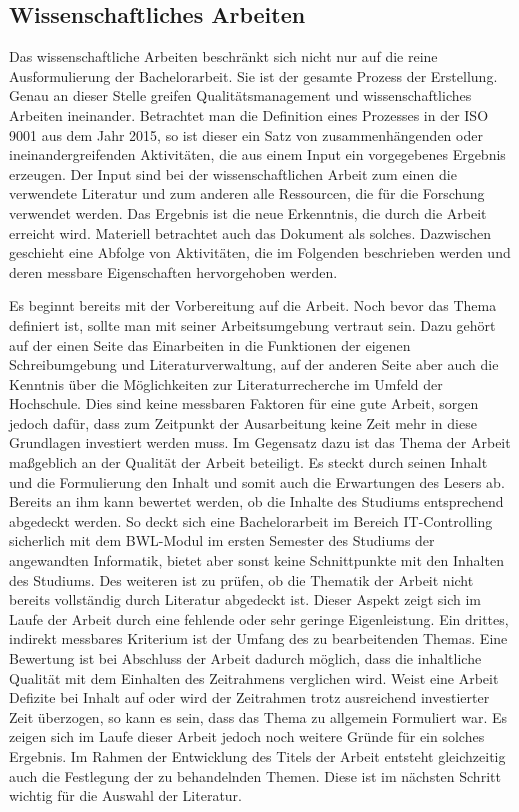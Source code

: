 \subsection{Wissenschaftliches Arbeiten}
Das wissenschaftliche Arbeiten beschränkt sich nicht nur auf die reine Ausformulierung der Bachelorarbeit. Sie ist der gesamte Prozess der Erstellung. Genau an dieser Stelle greifen Qualitätsmanagement und wissenschaftliches Arbeiten ineinander. Betrachtet man die Definition eines Prozesses in der \ac{ISO} 9001 aus dem Jahr 2015, so ist dieser ein Satz von zusammenhängenden oder ineinandergreifenden Aktivitäten, die aus einem Input ein vorgegebenes Ergebnis erzeugen.\cite[Vgl.][]{iso9001:2015}
Der Input sind bei der wissenschaftlichen Arbeit zum einen die verwendete Literatur und zum anderen alle Ressourcen, die für die Forschung verwendet werden. Das Ergebnis ist die neue Erkenntnis, die durch die Arbeit erreicht wird. Materiell betrachtet auch das Dokument als solches. Dazwischen geschieht eine Abfolge von Aktivitäten, die im Folgenden beschrieben werden und deren messbare Eigenschaften hervorgehoben werden.

Es beginnt bereits mit der Vorbereitung auf die Arbeit. Noch bevor das Thema definiert ist, sollte man mit seiner Arbeitsumgebung vertraut sein. Dazu gehört auf der einen Seite das Einarbeiten in die Funktionen der eigenen Schreibumgebung und Literaturverwaltung, auf der anderen Seite aber auch die Kenntnis über die Möglichkeiten zur Literaturrecherche im Umfeld der Hochschule.\cite[Vgl.][S. 43]{Baensch:2013} Dies sind keine messbaren Faktoren für eine gute Arbeit, sorgen jedoch dafür, dass zum Zeitpunkt der Ausarbeitung keine Zeit mehr in diese Grundlagen investiert werden muss.
Im Gegensatz dazu ist das Thema der Arbeit maßgeblich an der Qualität der Arbeit beteiligt. Es steckt durch seinen Inhalt und die Formulierung den Inhalt und somit auch die Erwartungen des Lesers ab. Bereits an ihm kann bewertet werden, ob die Inhalte des Studiums entsprechend abgedeckt werden. So deckt sich eine Bachelorarbeit im Bereich IT-Controlling sicherlich mit dem BWL-Modul im ersten Semester des Studiums der angewandten Informatik, bietet aber sonst keine Schnittpunkte mit den Inhalten des Studiums. Des weiteren ist zu prüfen, ob die Thematik der Arbeit nicht bereits vollständig durch Literatur abgedeckt ist. Dieser Aspekt zeigt sich im Laufe der Arbeit durch eine fehlende oder sehr geringe Eigenleistung. Ein drittes, indirekt messbares Kriterium ist der Umfang des zu bearbeitenden Themas. Eine Bewertung ist bei Abschluss der Arbeit dadurch möglich, dass die inhaltliche Qualität mit dem Einhalten des Zeitrahmens verglichen wird. Weist eine Arbeit Defizite bei Inhalt auf oder wird der Zeitrahmen trotz ausreichend investierter Zeit überzogen, so kann es sein, dass das Thema zu allgemein Formuliert war.\cite[Vgl.][S. 46 f.]{Baensch:2013} Es zeigen sich im Laufe dieser Arbeit jedoch noch weitere Gründe für ein solches Ergebnis.
Im Rahmen der Entwicklung des Titels der Arbeit entsteht gleichzeitig auch die Festlegung der zu behandelnden Themen. Diese ist im nächsten Schritt wichtig für die Auswahl der Literatur.


